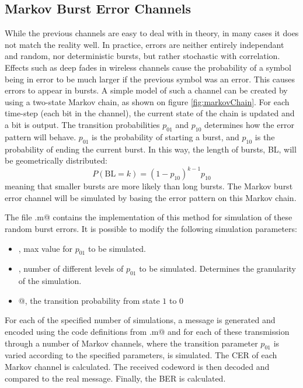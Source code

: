 \subsection{Markov Burst Error Channels}
While the previous channels are easy to deal with in theory, in many cases it does not match the reality well. In practice, errors are neither entirely independant and random, nor deterministic bursts, but rather stochastic with correlation. Effects such as deep fades in wireless channels cause the probability of a symbol being in error to be much larger if the previous symbol was an error. This causes errors to appear in bursts. A simple model of such a channel can be created by using a two-state Markov chain, as shown on figure \ref{fig:markovChain}. For each time-step (each bit in the channel), the current state of the chain is updated and a bit is output. The transition probabilities $p_{01}$ and $p_{10}$ determines how the error pattern will behave. $p_{01}$ is the probability of starting a burst, and $p_{10}$ is the probability of ending the current burst. In this way, the length of bursts, BL, will be geometrically distributed:
\begin{equation}
P(\text{BL} = k) = (1-p_{10})^{k-1}  p_{10}
\end{equation}
meaning that smaller bursts are more likely than long bursts. The Markov burst error channel will be simulated by basing the error pattern on this Markov chain.


The file \verb@markovErrors.m@ contains the implementation of this method for simulation of these random burst errors. It is possible to modify the following simulation parameters:
\begin{itemize}\setlength\itemsep{0pt}
\item \verb@burstProbabilityMax@, max value for $p_{01}$ to be simulated.
\item \verb@burstProbabilityLevels@, number of different levels of $p_{01}$ to be simulated. Determines the granularity of the simulation.
\item {}@, the transition probability from state $1$ to $0$
\end{itemize}
For each of the specified number of simulations, a message is generated and encoded using the code definitions from \verb@trellisGenerator.m@ and for each of these transmission through a number of Markov channels, where the transition parameter $p_{01}$ is varied according to the specified parameters, is simulated. The CER of each Markov channel is calculated. The received codeword is then decoded and compared to the real message. Finally, the BER is calculated.
